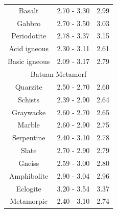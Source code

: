 \begin{table}[h]
{\begin{tabular}{ccc}
		Basalt         & 2.70 - 3.30                                                        & 2.99                                                                 \\
		Gabbro         & 2.70 - 3.50                                                        & 3.03                                                                 \\
		Periodotite    & 2.78 - 3.37                                                        & 3.15                                                                 \\
		Acid igneous   & 2.30 - 3.11                                                        & 2.61                                                                 \\
		Basic igneous  & 2.09 - 3.17                                                        & 2.79                                                                 \\ \hline
		\multicolumn{3}{c}{Batuan Metamorf}                                                                                                                        \\ \hline
		Quarzite       & 2.50 - 2.70                                                        & 2.60                                                                 \\
		Schists        & 2.39 - 2.90                                                        & 2.64                                                                 \\
		Graywacke      & 2.60 - 2.70                                                        & 2.65                                                                 \\
		Marble         & 2.60 - 2.90                                                        & 2.75                                                                 \\
		Serpentine     & 2.40 - 3.10                                                        & 2.78                                                                 \\
		Slate          & 2.70 - 2.90                                                        & 2.79                                                                 \\
		Gneiss         & 2.59 - 3.00                                                        & 2.80                                                                 \\
		Amphibolite    & 2.90 - 3.04                                                        & 2.96                                                                 \\
		Eclogite       & 3.20 - 3.54                                                        & 3.37                                                                 \\
		Metamorpic     & 2.40 - 3.10                                                        & 2.74                                                                 \\ \hline
	\end{tabular}%
}
\end{table}

